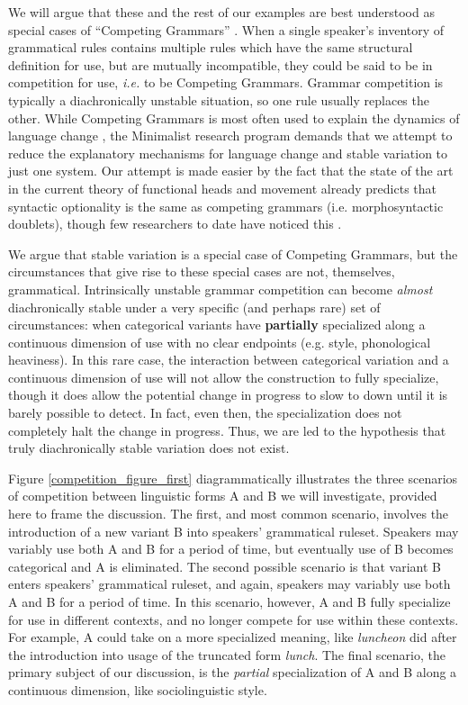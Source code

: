 We will argue that these and the rest of our examples are best understood as special cases of ``Competing Grammars'' \citep[][]{kroch1989}.
When a single speaker's inventory of grammatical rules contains multiple rules which have the same structural definition for use, but are mutually incompatible, they could be said to be in competition for use, \textsl{i.e.} to be Competing Grammars.
Grammar competition is typically a diachronically unstable situation, so one rule usually replaces the other.
While Competing Grammars is most often used to explain the dynamics of language change \citep{yang2000,yang2002}, the Minimalist research program demands that we attempt to reduce the explanatory mechanisms for language change and stable variation to just one system.
Our attempt is made easier by the fact that the state of the art in the current  theory of functional heads and movement already predicts that syntactic optionality is the same as competing grammars (i.e. morphosyntactic doublets), though few researchers to date have noticed this \citep[with the exception of][]{kroch1994}.

We argue that stable variation is a special case of Competing Grammars, but the circumstances that give rise to these special cases are not, themselves, grammatical.
Intrinsically unstable grammar competition can become \textsl{almost} diachronically stable under a very specific (and perhaps rare) set of circumstances: when categorical variants have \textbf{partially} specialized along a continuous dimension of use with no clear endpoints (e.g. style, phonological heaviness). 
In this rare case, the interaction between categorical variation and a continuous dimension of use will not allow the construction to fully specialize, though it does allow the potential change in progress to slow to down until it is barely possible to detect. In fact, even then, the specialization does not completely halt the change in progress.
Thus, we are led to the hypothesis that truly diachronically stable variation does not exist.

Figure \ref{competition_figure_first} diagrammatically illustrates the three scenarios of competition between linguistic forms A and B we will investigate, provided here to frame the discussion. 
The first, and most common scenario, involves the introduction of a new variant B into speakers' grammatical ruleset.
Speakers may variably use both A and B for a period of time, but eventually use of B becomes categorical and A is eliminated.
The second possible scenario is that variant B enters speakers' grammatical ruleset, and again, speakers may variably use both A and B for a period of time.
In this scenario, however, A and B fully specialize for use in different contexts, and no longer compete for use within these contexts.
For example, A could take on a more specialized meaning, like {\it luncheon} did after the introduction into usage of the truncated form {\it lunch}.
The final scenario, the primary subject of our discussion, is the {\it partial} specialization of A and B along a continuous dimension, like sociolinguistic style.


